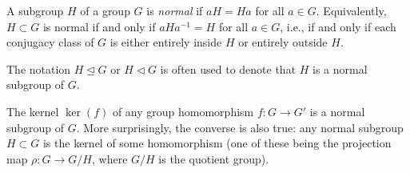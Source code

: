 \documentclass{article}
\begin{document}
A subgroup $H$ of a group $G$ is {\em normal} if $aH = Ha$ for all $a \in G$. Equivalently, $H \subset G$ is normal if and only if $aHa^{-1} = H$ for all $a \in G$, i.e., if and only if each conjugacy class of $G$ is either entirely inside $H$ or entirely outside $H$.

The notation $H \trianglelefteq G$ or $H \triangleleft G$ is often used to denote that $H$ is a normal subgroup of $G$.

The kernel $\ker(f)$ of any group homomorphism $f: G \longrightarrow G'$ is a normal subgroup of $G$. More surprisingly, the converse is also true: any normal subgroup $H \subset G$ is the kernel of some homomorphism (one of these being the projection map $\rho: G \longrightarrow G/H$, where $G/H$ is the quotient group).
\end{document}
